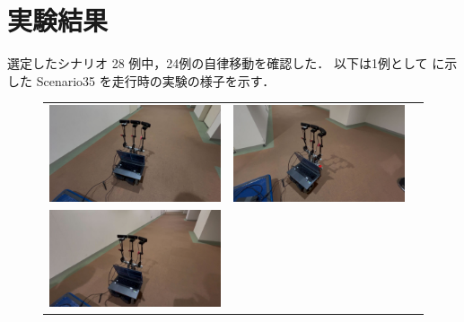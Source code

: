 \newpage
\section{実験結果}
選定したシナリオ 28 例中，24例の自律移動を確認した．
以下は1例として に示した Scenario35 を走行時の実験の様子を示す．

\begin{figure}[htbp]
    \begin{tabular}{ccc}
        \begin{minipage}[t]{0.5\textwidth}
            \centering
            \includegraphics[keepaspectratio, width=70mm]{images/png/ishiguro/exp_0.png}
        \end{minipage} &
        \begin{minipage}[t]{0.5\textwidth}
            \centering
            \includegraphics[keepaspectratio, width=70mm]{images/png/ishiguro/exp_1.png}
        \end{minipage} \\
        \begin{minipage}[t]{0.5\textwidth}
            \centering
            \includegraphics[keepaspectratio, width=70mm]{images/png/ishiguro/exp_2.png}
        \end{minipage} &

\end{tabular}
\end{figure}
